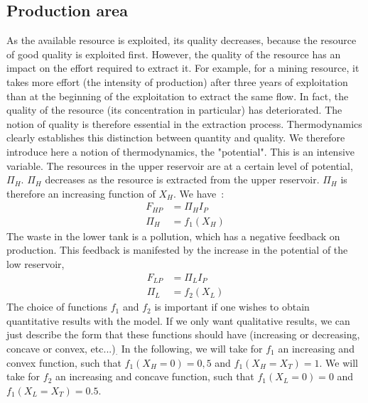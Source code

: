\documentclass[12pt,a4paper]{article}%
\begin{document}
\begin{appendix}
\subsection{Production area}
As the available resource is exploited, its quality decreases, because the resource of good quality is exploited first. However, the quality of the resource has an impact on the effort required to extract it. For example, for a mining resource, it takes more effort (the intensity of production) after three years of exploitation than at the beginning of the exploitation to extract the same flow. In fact, the quality of the resource (its concentration in particular) has deteriorated. The notion of quality is therefore essential in the extraction process. Thermodynamics clearly establishes this distinction between quantity and quality. We therefore introduce here a notion of thermodynamics, the "potential". This is an intensive variable. The resources in the upper reservoir are at a certain level of potential, $\Pi_{H}$. $\Pi_{H}$ decreases as the resource is extracted from the upper reservoir. $\Pi_{H}$ is therefore an increasing function of $X_{H}$.  We have~: 
\begin{align}
	F_{HP} &= \Pi_{H} I_{P} \\
	\Pi_{H} &= f_1(X_H)
\end{align} 
The waste in the lower tank is a pollution, which has a negative feedback on production. This feedback is manifested by the increase in the potential of the low reservoir, 
\begin{align}
	F_{LP} &= \Pi_L I_P \\
	\Pi_{L} &= f_2(X_L)
\end{align}  
The choice of functions $f_{1}$ and $f_{2}$ is important if one wishes to obtain quantitative results with the model. If we only want qualitative results, we can just describe the form that these functions should have (increasing or decreasing, concave or convex, etc...)$_{.}$ In the following, we will take for $f_{1}$ an increasing and convex function, such that $f_{1}(X_{H}=0)=0,5$ and $f_{1}(X_{H}=X_{T})=1$. We will take for $f_{2}$ an increasing and concave function, such that $f_{1}(X_{L}=0)=0$ and $f_{1}(X_{L}=X_{T})=0.5$. 
\begin{figure}[h] 
	\centering 

\end{figure}
\end{appendix}
\end{document}
